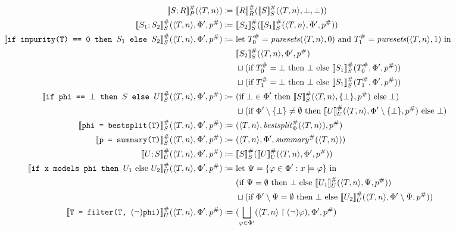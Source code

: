 \begin{figure}
\centering
\newcommand{\argtuple}{\langle T, n \rangle, \Phi', p^\#}
\begin{align*}
\den[P]{S ; R}^\#(\langle T, n \rangle) \coloneqq&~
\den[R]{R}^\#(\den[S]{S}^\#(\langle T, n \rangle, \bot, \bot)) \\
%
\den[S]{S_1 ; S_2}^\#(\argtuple) \coloneqq&~
\den[S]{S_2}^\#(\den[S]{S_1}^\#(\argtuple)) \\
%
\den[S]{\iteimpuritynode{S_1}{S_2}}^\#(\argtuple) \coloneqq&~
\text{let } T_0^\# = \mathit{puresets}(\langle T, n \rangle, 0) \text{ and }
T_1^\# = \mathit{puresets}(\langle T, n \rangle, 1) \text{ in } \\
&~\den[S]{S_2}^\#(\langle T, n \rangle, \Phi', p^\#) \\
&~\sqcup
(\text{if } T_0^\# = \bot \text{ then } \bot \text{ else } \den[S]{S_1}^\#(T_0^\#, \Phi', p^\#)) \\
&~\sqcup
(\text{if } T_1^\# = \bot \text{ then } \bot \text{ else } \den[S]{S_1}^\#(T_1^\#, \Phi', p^\#)) \\
%
\den[S]{\itetrivialnode{S}{U}}^\#(\argtuple) \coloneqq&~
(\text{if } \bot \in \Phi' \text{ then } \den[S]{S}^\#(\langle T, n \rangle, \{\bot\}, p^\#) \text{ else } \bot) \\
&~\sqcup
(\text{if } \Phi' \setminus \{\bot\} \neq \emptyset \text{ then }
\den[U]{U}^\#(\langle T, n \rangle, \Phi' \setminus \{\bot\}, p^\#) \text{ else } \bot)\\
%
\den[S]{\bestsplitnode}^\#(\argtuple)
\coloneqq&~ (\langle T, n \rangle, \mathit{bestsplit}_\Phi^\#(\langle T, n \rangle), p^\#) \\
%
\den[S]{\summarynode}^\#(\argtuple) \coloneqq&~
(\langle T, n \rangle, \Phi', \mathit{summary}^\#(\langle T, n \rangle)) \\
%
\den[U]{U ; S}^\#(\argtuple) \coloneqq&~
\den[S]{S}^\#(\den[U]{U}^\#(\argtuple)) \\
%
\den[U]{\itemodelsnode{U_1}{U_2}}^\#(\argtuple) \coloneqq&~
\text{let } \Psi = \{\varphi \in \Phi' : x \models \varphi\} \text{ in } \\
&~(\text{if } \Psi = \emptyset \text{ then } \bot \text{ else }
\den[U]{U_1}^\#(\langle T, n \rangle, \Psi, p^\#)) \\
&~\sqcup
(\text{if } \Phi' \setminus \Psi = \emptyset \text{ then } \bot \text{ else }
\den[U]{U_2}^\#(\langle T, n \rangle, \Phi' \setminus \Psi, p^\#)) \\
%
\den[U]{\filternode[(\lnot)]}^\#(\argtuple) \coloneqq&~
(\bigsqcup_{\varphi \in \Phi'} (\langle T, n \rangle \upharpoonright (\lnot) \varphi), \Phi', p^\#) \\

\end{align*}
\end{figure}
